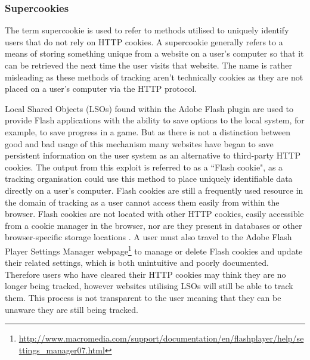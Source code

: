 \documentclass[12pt]{article}
\begin{document}
\subsubsection{Supercookies} \label{Supercookies}
The term supercookie is used to refer to methods utilised to uniquely identify users that do not rely on HTTP cookies. A supercookie generally refers to a means of storing something unique from a website on a user's computer so that it can be retrieved the next time the user visits that website. The name is rather misleading as these methods of tracking aren't technically cookies as they are not placed on a user's computer via the HTTP protocol. \newline 

Local Shared Objects (LSOs) found within the Adobe Flash plugin are used to provide Flash applications with the ability to save options to the local system, for example, to save progress in a game. But as there is not a distinction between good and bad usage of this mechanism many websites have began to save persistent information on the user system as an alternative to third-party HTTP cookies. The output from this exploit is referred to as a ``Flash cookie", as a tracking organisation could use this method to place uniquely identifiable data directly on a user's computer. Flash cookies are still a frequently used resource in the domain of tracking as a user cannot access them easily from within the browser. Flash cookies are not located with other HTTP cookies, easily accessible from a cookie manager in the browser, nor are they present in databases or other browser-specific storage locations \parencite{flashCookies}. A user must also travel to the Adobe Flash Player Settings Manager webpage\footnote{\url{http://www.macromedia.com/support/documentation/en/flashplayer/help/settings_manager07.html}} to manage or delete Flash cookies and update their related settings, which is both unintuitive and poorly documented. Therefore users who have cleared their HTTP cookies may think they are no longer being tracked, however websites utilising LSOs will still be able to track them. This process is not transparent to the user meaning that they can be unaware they are still being tracked.\\ 
\end{document}
